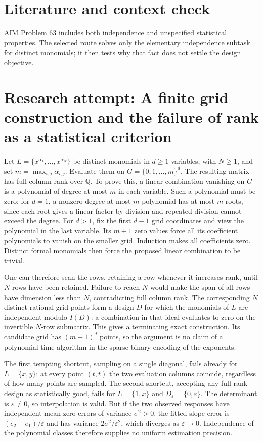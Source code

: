 \documentclass[11pt]{article}
\begin{document}
\section{Literature and context check}
AIM Problem 63 includes both independence and unspecified statistical properties. The selected route solves only the elementary independence subtask for distinct monomials; it then tests why that fact does not settle the design objective.
\section{Research attempt: A finite grid construction and the failure of rank as a statistical criterion}
Let $L=\{x^{\alpha_1},\ldots,x^{\alpha_N}\}$ be distinct monomials in $d\ge1$ variables, with $N\ge1$, and set $m=\max_{i,j}\alpha_{i,j}$. Evaluate them on $G=\{0,1,\ldots,m\}^d$. The resulting matrix has full column rank over $\mathbb Q$. To prove this, a linear combination vanishing on $G$ is a polynomial of degree at most $m$ in each variable. Such a polynomial must be zero: for $d=1$, a nonzero degree-at-most-$m$ polynomial has at most $m$ roots, since each root gives a linear factor by division and repeated division cannot exceed the degree. For $d>1$, fix the first $d-1$ grid coordinates and view the polynomial in the last variable. Its $m+1$ zero values force all its coefficient polynomials to vanish on the smaller grid. Induction makes all coefficients zero. Distinct formal monomials then force the proposed linear combination to be trivial.

One can therefore scan the rows, retaining a row whenever it increases rank, until $N$ rows have been retained. Failure to reach $N$ would make the span of all rows have dimension less than $N$, contradicting full column rank. The corresponding $N$ distinct rational grid points form a design $D$ for which the monomials of $L$ are independent modulo $I(D)$: a combination in that ideal evaluates to zero on the invertible $N$-row submatrix. This gives a terminating exact construction. Its candidate grid has $(m+1)^d$ points, so the argument is no claim of a polynomial-time algorithm in the sparse binary encoding of the exponents.

The first tempting shortcut, sampling on a single diagonal, fails already for $L=\{x,y\}$: at every point $(t,t)$ the two evaluation columns coincide, regardless of how many points are sampled. The second shortcut, accepting any full-rank design as statistically good, fails for $L=\{1,x\}$ and $D_\varepsilon=\{0,\varepsilon\}$. The determinant is $\varepsilon\ne0$, so interpolation is valid. But if the two observed responses have independent mean-zero errors of variance $\sigma^2>0$, the fitted slope error is $(e_2-e_1)/\varepsilon$ and has variance $2\sigma^2/\varepsilon^2$, which diverges as $\varepsilon\to0$. Independence of the polynomial classes therefore supplies no uniform estimation precision.
\end{document}
